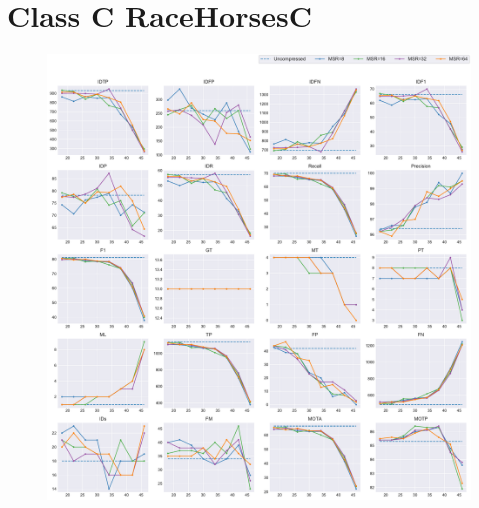 
\section{Class C RaceHorsesC}
\label{sec:appendix/RaceHorsesC_all}


\begin{figure}[!htbp]
\centering
\includegraphics[width=1.0\linewidth]{img/appendix/RaceHorsesC_all_multiplots_qp.pdf}
\caption[Result of all object classes in Class C RaceHorsesC with Horizontal Axis of QP]{}
\label{fig:RaceHorsesC_all_qp}
\end{figure}

